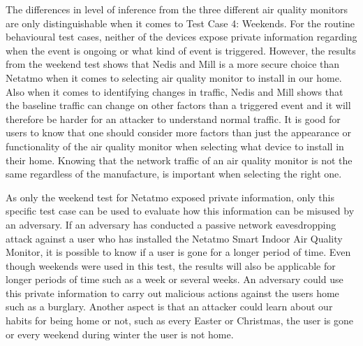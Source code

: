 The differences in level of inference from the three different air quality monitors are only distinguishable when it comes to Test Case 4: Weekends. For the routine behavioural test cases, neither of the devices expose private information regarding when the event is ongoing or what kind of event is triggered. However, the results from the weekend test shows that Nedis and Mill is a more secure choice than Netatmo when it comes to selecting air quality monitor to install in our home. Also when it comes to identifying changes in traffic, Nedis and Mill shows that the baseline traffic can change on other factors than a triggered event and it will therefore be harder for an attacker to understand normal traffic. It is good for users to know that one should consider more factors than just the appearance or functionality of the air quality monitor when selecting what device to install in their home. Knowing that the network traffic of an air quality monitor is not the same regardless of the manufacture, is important when selecting the right one. 

As only the weekend test for Netatmo exposed private information, only this specific test case can be used to evaluate how this information can be misused by an adversary. If an adversary has conducted a passive network eavesdropping attack against a user who has installed the Netatmo Smart Indoor Air Quality Monitor, it is possible to know if a user is gone for a longer period of time. Even though weekends were used in this test, the results will also be applicable for longer periods of time such as a week or several weeks. An adversary could use this private information to carry out malicious actions against the users home such as a burglary. Another aspect is that an attacker could learn about our habits for being home or not, such as every Easter or Christmas, the user is gone or every weekend during winter the user is not home. 